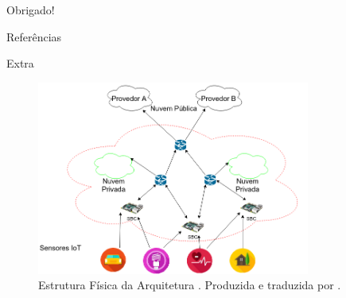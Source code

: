 \documentclass[aspectratio=43,10pt]{beamer}
\begin{document}
{\begin{frame}[standout]
  Obrigado!
\end{frame}}

\begin{frame}[allowframebreaks]{Referências}
  
\end{frame}

\appendix

\begin{frame}[fragile]{Extra}
  \begin{figure}[ht]
  \centering
  \includegraphics[width=0.8\textwidth]{figuras/idsa-iot-quali-000.png}
  \caption{Estrutura Física da Arquitetura \arch.
  Produzida e traduzida por .}
  \label{fig:ids-iot-phy}
  \end{figure}
\end{frame}
\end{document}
